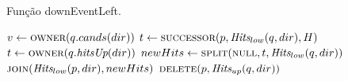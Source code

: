 \begin{algorithm}[H]
    \caption[Algoritmo \textsc{downEventLeft} do par mais próximo cinético]{Função downEventLeft.} \label{alg:par-cinetico:eventodowncaso1}
    \begin{algorithmic}[1]
            \State $v \leftarrow \Call{owner}{q.cands(dir)}$ 
                \State {}
            \EndIf
            \State {}
            \State $t \leftarrow \Call{successor}{p, \Hits_{low}(q, dir), H}$
                \State $t \leftarrow \Call{owner}{q.\hitsup(dir)}$ 
            \EndIf
            \State $newHits \leftarrow \Call{split}{\nnull, t, \Hits_{low}(q, dir)}$ 
            \State $\Call{join}{\Hits_{low}(p, dir), newHits}$
            \State $\Call{delete}{p, \Hits_{up}(q, dir)}$
                \State {}
            \EndIf
        \EndFunction
    \end{algorithmic}
\end{algorithm}